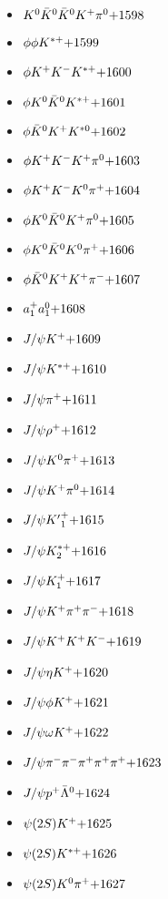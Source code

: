 \begin{multicols}{3}
\begin{itemize}
 \item $ K^{0} \bar{K}^{0} \bar{K}^{0} K^{+} \pi^{0} \hfill{+1598}$
 \item $ \phi \phi K^{*+} \hfill{+1599}$
 \item $ \phi K^{+} K^{-} K^{*+} \hfill{+1600}$
 \item $ \phi K^{0} \bar{K}^{0} K^{*+} \hfill{+1601}$
 \item $ \phi \bar{K}^{0} K^{+} K^{*0} \hfill{+1602}$
 \item $ \phi K^{+} K^{-} K^{+} \pi^{0} \hfill{+1603}$
 \item $ \phi K^{+} K^{-} K^{0} \pi^{+} \hfill{+1604}$
 \item $ \phi K^{0} \bar{K}^{0} K^{+} \pi^{0} \hfill{+1605}$
 \item $ \phi K^{0} \bar{K}^{0} K^{0} \pi^{+} \hfill{+1606}$
 \item $ \phi \bar{K}^{0} K^{+} K^{+} \pi^{-} \hfill{+1607}$
 \item $ a_{1}^{+} a_{1}^{0} \hfill{+1608}$
 \item $ J/\psi K^{+} \hfill{+1609}$
 \item $ J/\psi K^{*+} \hfill{+1610}$
 \item $ J/\psi \pi^{+} \hfill{+1611}$
 \item $ J/\psi \rho^{+} \hfill{+1612}$
 \item $ J/\psi K^{0} \pi^{+} \hfill{+1613}$
 \item $ J/\psi K^{+} \pi^{0} \hfill{+1614}$
 \item $ J/\psi {K^{\prime}}_{1}^{+} \hfill{+1615}$
 \item $ J/\psi K_{2}^{*+} \hfill{+1616}$
 \item $ J/\psi K_{1}^{+} \hfill{+1617}$
 \item $ J/\psi K^{+} \pi^{+} \pi^{-} \hfill{+1618}$
 \item $ J/\psi K^{+} K^{+} K^{-} \hfill{+1619}$
 \item $ J/\psi \eta K^{+} \hfill{+1620}$
 \item $ J/\psi \phi K^{+} \hfill{+1621}$
 \item $ J/\psi \omega K^{+} \hfill{+1622}$
 \item $ J/\psi \pi^{-} \pi^{-} \pi^{+} \pi^{+} \pi^{+} \hfill{+1623}$
 \item $ J/\psi p^{+} \bar{\Lambda}^{0} \hfill{+1624}$
 \item $ \psi(2S) K^{+} \hfill{+1625}$
 \item $ \psi(2S) K^{*+} \hfill{+1626}$
 \item $ \psi(2S) K^{0} \pi^{+} \hfill{+1627}$

\end{itemize}
\end{multicols}
